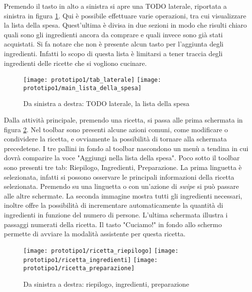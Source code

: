 \clearpage
Premendo il tasto in alto a sinistra si apre una TODO laterale, riportata a sinistra in figura \ref{fig:p1_lista_spesa}.
Qui è possibile effettuare varie operazioni, tra cui visualizzare la lista della spesa.
Quest'ultima è divisa in due sezioni in modo che risulti chiaro quali sono gli ingredienti ancora da comprare e quali invece sono già stati acquistati.
Si fa notare che non è presente alcun tasto per l'aggiunta degli ingredienti.
Infatti lo scopo di questa lista è limitarsi a tener traccia degli ingredienti delle ricette che si vogliono cucinare.

\begin{figure}[ht]
  \begin{center}
    \texttt{[image: prototipo1/tab\_laterale]}
    \texttt{[image: prototipo1/main\_lista\_della\_spesa]}
    \caption{Da sinistra a destra: TODO laterale, la lista della spesa}
    \label{fig:p1_lista_spesa}
  \end{center}
\end{figure}


\clearpage
Dalla attività principale, premendo una ricetta, si passa alle prima schermata in figura \ref{fig:p1_ricetta}.
Nel toolbar sono presenti alcune azioni comuni, come modificare o condividere la ricetta, e ovviamente la possibilità di tornare alla schermata precedetene.
I tre pallini in fondo al toolbar nascondono un menù a tendina in cui dovrà comparire la voce "Aggiungi nella lista della spesa".
Poco sotto il toolbar sono presenti tre tab: Riepilogo, Ingredienti, Preparazione.
La prima linguetta è selezionata, infatti si possono osservare le principali informazioni della ricetta selezionata.
Premendo su una linguetta o con un'azione di \textit{swipe} si può passare alle altre schermate.
La seconda immagine mostra tutti gli ingredienti necessari, inoltre offre la possibilità di incrementare automaticamente la quantità di ingredienti in funzione del numero di persone.
L'ultima schermata illustra i passaggi numerati della ricetta.
Il tasto "Cuciamo!" in fondo allo schermo permette di avviare la modalità assistente per questa ricetta.

\begin{figure}[ht]
  \begin{center}
    \texttt{[image: prototipo1/ricetta\_riepilogo]}
    \texttt{[image: prototipo1/ricetta\_ingredienti]}
    \texttt{[image: prototipo1/ricetta\_preparazione]}
    \caption{Da sinistra a destra: riepilogo, ingredienti, preparazione}
    \label{fig:p1_ricetta}
  \end{center}
\end{figure}

